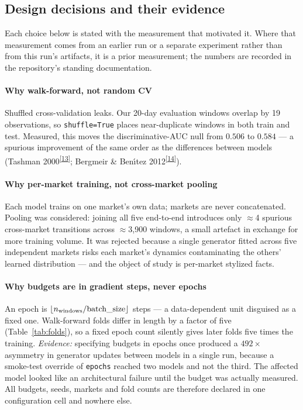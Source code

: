 \documentclass[11pt,a4paper]{article}
\makeatletter
\newcommand{\tcite}[1]{\textsuperscript{[\hyperlink{R:#1}{#1}]}}
\DeclareRobustCommand{\_}{\ifmmode\nfss@text{\textunderscore}\else\textunderscore\allowbreak\fi}
\makeatother
\begin{document}
\subsection{Design decisions and their evidence}
\label{sec:decisions}
Each choice below is stated with the measurement that motivated it. Where that measurement comes from an earlier run or a separate experiment rather than from this run's artifacts, it is a prior measurement; the numbers are recorded in the repository's standing documentation.

\paragraph{Why walk-forward, not random CV} Shuffled cross-validation leaks. Our 20-day evaluation windows overlap by 19 observations, so \texttt{shuffle=True} places near-duplicate windows in both train and test. Measured, this moves the discriminative-AUC null from $0.506$ to $0.584$ --- a spurious improvement of the same order as the differences between models (Tashman 2000\tcite{13}; Bergmeir \& Ben\'{\i}tez 2012\tcite{14}).

\paragraph{Why per-market training, not cross-market pooling} Each model trains on one market's own data; markets are never concatenated. Pooling was considered: joining all five end-to-end introduces only $\approx$4 spurious cross-market transitions across $\approx$3{,}900 windows, a small artefact in exchange for more training volume. It was rejected because a single generator fitted across five independent markets risks each market's dynamics contaminating the others' learned distribution --- and the object of study is per-market stylized facts.

\paragraph{Why budgets are in gradient steps, never epochs} An epoch is $\lfloor n_\text{windows}/\text{batch\_size}\rfloor$ steps --- a data-dependent unit disguised as a fixed one. Walk-forward folds differ in length by a factor of five (Table~\ref{tab:folds}), so a fixed epoch count silently gives later folds five times the training. \textit{Evidence:} specifying budgets in epochs once produced a $492\times$ asymmetry in generator updates between models in a single run, because a smoke-test override of \texttt{epochs} reached two models and not the third. The affected model looked like an architectural failure until the budget was actually measured. All budgets, seeds, markets and fold counts are therefore declared in one configuration cell and nowhere else.
\end{document}
